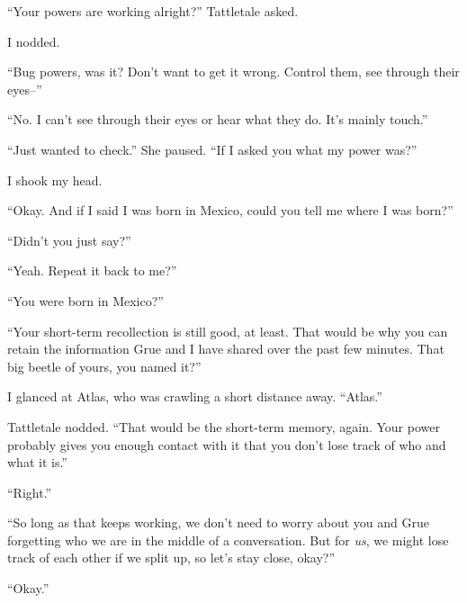 





``Your powers are working alright?'' Tattletale asked.



I nodded.



``Bug powers, was it?  Don't want to get it wrong.  Control them, see through their eyes--''



``No.  I can't see through their eyes or hear what they do.  It's mainly touch.''



``Just wanted to check.''  She paused.  ``If I asked you what my power was?''



I shook my head.



``Okay.  And if I said I was born in Mexico, could you tell me where I was born?''



``Didn't you just say?''



``Yeah.  Repeat it back to me?''



``You were born in Mexico?''



``Your short-term recollection is still good, at least.  That would be why you can retain the information Grue and I have shared over the past few minutes.  That big beetle of yours, you named it?''



I glanced at Atlas, who was crawling a short distance away.  ``Atlas.''



Tattletale nodded.  ``That would be the short-term memory, again. Your power probably gives you enough contact with it that you don't lose track of who and what it is.''



``Right.''



``So long as that keeps working, we don't need to worry about you and Grue forgetting who we are in the middle of a conversation.  But for \emph{us}, we might lose track of each other if we split up, so let's stay close, okay?''



``Okay.''



